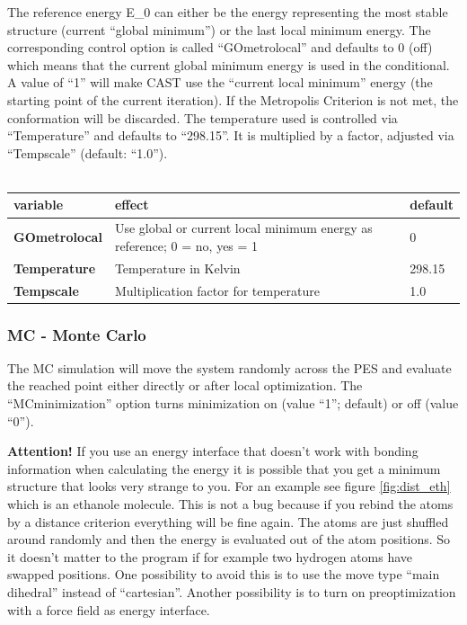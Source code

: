 \documentclass[10pt,a4paper]{article} %
\begin{document}
	The reference energy E\_0 can either be the energy representing the most stable structure (current ``global minimum'') or the last local minimum energy. The corresponding control option is called ``GOmetrolocal'' and defaults to 0 (off) which means that the current global minimum energy is used in the conditional. A value of ``1'' will make \ac{CAST} use the ``current local minimum'' energy (the starting point of the current iteration). If the Metropolis Criterion is not met, the conformation will be discarded.
	The temperature used is controlled via ``Temperature'' and defaults to ``298.15''. It is multiplied by a factor, adjusted via ``Tempscale'' (default: ``1.0'').\\~\\
	
	\begin{longtable}{|p{3.5cm}|p{5cm}|p{2.5cm}|}
		variable & effect & default\\
		\hline
		\textbf{GOmetrolocal} & Use global or current local minimum energy as reference; 0 = no, yes = 1 & 0 \\
		\textbf{Temperature} & Temperature in Kelvin & 298.15 \\
		\textbf{Tempscale} & Multiplication factor for temperature & 1.0
	\end{longtable}
	
	\subsubsection{MC - Monte Carlo}
	The \ac{MC} simulation will move the system randomly across the \ac{PES} and evaluate the reached point either directly or after local optimization. The ``MCminimization'' option turns minimization on (value ``1''; default) or off (value ``0''). 
	
	\textbf{Attention!}
	If you use an energy interface that doesn't work with bonding information when calculating the energy it is possible that you get a minimum structure that looks very strange to you. For an example see figure \ref{fig:dist_eth} which is an ethanole molecule. This is not a bug because if you rebind the atoms by a distance criterion everything will be fine again. The atoms are just shuffled around randomly and then the energy is evaluated out of the atom positions. So it doesn't matter to the program if for example two hydrogen atoms have swapped positions. One possibility to avoid this is to use the move type ``main dihedral'' instead of ``cartesian''. Another possibility is to turn on preoptimization with a force field as energy interface.
	
\end{document}
